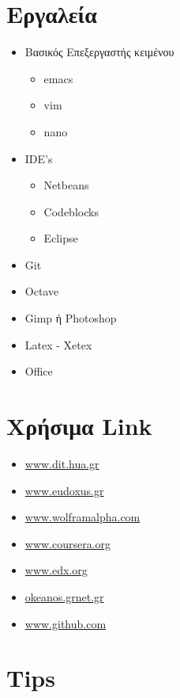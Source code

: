 \documentclass[legalpaper,10pt,a5paper]{article}
\begin{document}
\section{Εργαλεία}
\begin{itemize}

 \item Βασικός Επεξεργαστής κειμένου
 \begin{itemize}
 \item[\Checkmark] emacs
 \item[\Checkmark] vim
 \item[\Checkmark] nano
 \end{itemize}
 \item IDE's 
  \begin{itemize}
 \item[\Checkmark] Netbeans
 \item[\Checkmark] Codeblocks
 \item[\Checkmark] Eclipse
 
 \end{itemize}
 \item Git 
 \item Octave
 \item Gimp ή Photoshop
 \item Latex - Xetex
 \item Office

\end{itemize}

\section{Χρήσιμα Link}
\begin{itemize}
 \item[\Checkmark] \href{http://www.dit.hua.gr}{www.dit.hua.gr}
 \item[\Checkmark] \href{http://www.eudoxus.gr}{www.eudoxus.gr}
 \item[\Checkmark] \href{http://www.wolframalpha.com}{www.wolframalpha.com}
 \item[\Checkmark] \href{http://www.coursera.org}{www.coursera.org}
 \item[\Checkmark] \href{http://www.edx.org}{www.edx.org}
 \item[\Checkmark] \href{http://www.okeanos.gr‎}{okeanos.grnet.gr}
 \item[\Checkmark] \href{http://www.github.com}{www.github.com}
\end{itemize}


\section{Tips}
\end{document}
